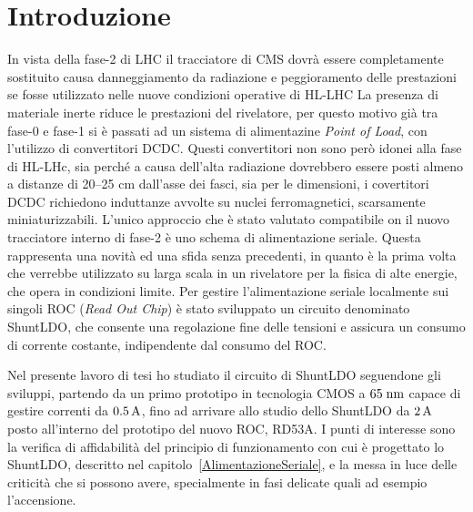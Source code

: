 \chapter{Introduzione}
In vista della fase-2 di LHC il tracciatore di CMS dovrà essere completamente sostituito causa danneggiamento da radiazione e peggioramento delle prestazioni se fosse utilizzato nelle nuove condizioni operative di HL-LHC
La presenza di materiale inerte riduce le prestazioni del rivelatore, per questo motivo già tra fase-0 e fase-1 si è passati ad un sistema di alimentazine \textit{Point of Load}, con l'utilizzo di convertitori DCDC. Questi convertitori non sono però idonei alla fase di HL-LHc, sia perché  a causa dell'alta radiazione dovrebbero essere posti almeno a distanze di 20--25 cm dall'asse dei fasci, sia per le dimensioni, i covertitori DCDC richiedono induttanze avvolte su nuclei ferromagnetici, scarsamente miniaturizzabili. 
L'unico approccio che è stato valutato compatibile on il nuovo tracciatore interno di fase-2 è uno schema di alimentazione seriale. 
Questa rappresenta una novità ed una sfida senza precedenti, in quanto è la prima volta che verrebbe utilizzato su larga scala in un rivelatore per la fisica di alte energie, che opera in condizioni limite. 
Per gestire l'alimentazione seriale localmente sui singoli ROC (\textit{Read Out Chip}) è stato sviluppato un circuito denominato ShuntLDO, che consente una regolazione fine delle tensioni e assicura un consumo di corrente costante, indipendente dal consumo del ROC.

Nel presente lavoro di tesi ho studiato il circuito di ShuntLDO seguendone gli sviluppi, partendo da un primo prototipo in tecnologia CMOS a $65 \rm \; nm$ capace di gestire correnti da $0.5\rm \, A$, fino ad arrivare allo studio dello ShuntLDO da $2\rm \, A$  posto all'interno del prototipo del nuovo ROC, RD53A. 
I punti di interesse sono la verifica di affidabilità del principio di funzionamento con cui è progettato lo ShuntLDO, descritto nel capitolo~\ref{AlimentazioneSeriale}, e la messa in luce delle criticità che si possono avere, specialmente in fasi delicate quali ad esempio l'accensione.

